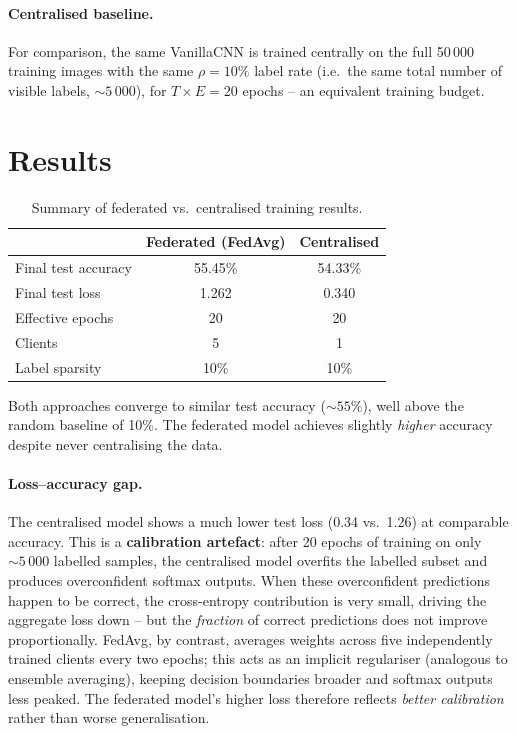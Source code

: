 \documentclass[11pt, a4paper]{article}
\begin{document}
\paragraph{Centralised baseline.}
For comparison, the same VanillaCNN is trained centrally on the full 50\,000
training images with the same $\rho = 10\%$ label rate (i.e.\ the same total
number of visible labels, ${\sim}5\,000$), for $T \times E = 20$ epochs -- an
equivalent training budget.

\section*{Results}

\begin{table}[h]
\centering
\caption{Summary of federated vs.\ centralised training results.}
\label{tab:results}
\begin{tabular}{lcc}
\toprule
& \textbf{Federated (FedAvg)} & \textbf{Centralised} \\
\midrule
Final test accuracy & 55.45\% & 54.33\% \\
Final test loss     & 1.262   & 0.340   \\
Effective epochs    & 20      & 20      \\
Clients             & 5       & 1       \\
Label sparsity      & 10\%    & 10\%    \\
\bottomrule
\end{tabular}
\end{table}

Both approaches converge to similar test accuracy (${\sim}55\%$), well above
the random baseline of 10\%.  The federated model achieves slightly
\emph{higher} accuracy despite never centralising the data.

\paragraph{Loss--accuracy gap.}
The centralised model shows a much lower test loss (0.34 vs.\ 1.26) at
comparable accuracy.  This is a \textbf{calibration artefact}: after 20 epochs
of training on only ${\sim}5\,000$ labelled samples, the centralised model
overfits the labelled subset and produces overconfident softmax outputs.  When
these overconfident predictions happen to be correct, the cross-entropy
contribution is very small, driving the aggregate loss down -- but the
\emph{fraction} of correct predictions does not improve proportionally.
FedAvg, by contrast, averages weights across five independently trained clients
every two epochs; this acts as an implicit regulariser (analogous to ensemble
averaging), keeping decision boundaries broader and softmax outputs less
peaked.  The federated model's higher loss therefore reflects \emph{better
calibration} rather than worse generalisation.
\end{document}
